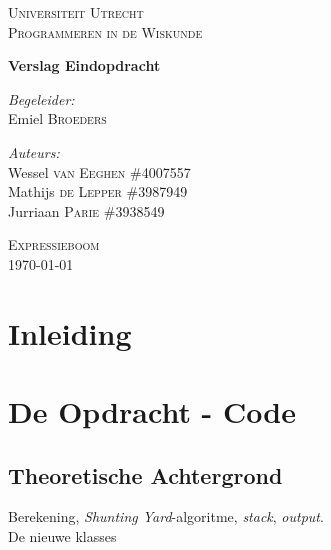 \documentclass[12pt]{article}
\begin{document}
\begin{titlepage}
\begin{center}

\textsc{\LARGE Universiteit Utrecht}\\[1.6cm]

\textsc{\Large Programmeren in de Wiskunde}\vspace{2pc}

{\huge \bfseries Verslag Eindopdracht}
\vspace{3pc}

\begin{minipage}{0.7\textwidth}
\begin{flushleft} \large
\emph{Begeleider:} \\
Emiel \textsc{Broeders} 
\end{flushleft}
\begin{flushleft} \large
\emph{Auteurs:}\\
Wessel \textsc{van Eeghen} \tab\#4007557\\
Mathijs \textsc{de Lepper}  \tab\#3987949\\
Jurriaan \textsc{Parie}  \tab\tab\#3938549
\end{flushleft}
\end{minipage}
\begin{minipage}{0.4\textwidth}
\end{minipage}
\vspace{10pc} 

\textsc{\Large Expressieboom}\\[4.0cm]
{\large \today}
\end{center}
\end{titlepage}

\newpage

\section{Inleiding}


\section{De Opdracht - Code}
\subsection{Theoretische Achtergrond}
Berekening, \textit{Shunting Yard}-algoritme, \textit{stack}, \textit{output}.\\ \newline
De nieuwe klasses 
\end{document}
